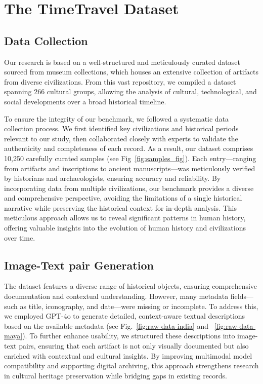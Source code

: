 \documentclass[11pt]{article}
\begin{document}
\section{The TimeTravel Dataset}

\subsection{Data Collection}
Our research is based on a well-structured and meticulously curated dataset sourced from museum collections, which houses an extensive collection of artifacts from diverse civilizations. From this vast repository, we compiled a dataset spanning 266 cultural groups, allowing the analysis of cultural, technological, and social developments over a broad historical timeline.

To ensure the integrity of our benchmark, we followed a systematic data collection process. We first identified key civilizations and historical periods relevant to our study, then collaborated closely with experts to validate the authenticity and completeness of each record. As a result, our dataset comprises 10,250 carefully curated samples (see Fig~\ref{fig:samples_fig}). Each entry—ranging from artifacts and inscriptions to ancient manuscripts—was meticulously verified by historians and archaeologists, ensuring accuracy and reliability. By incorporating data from multiple civilizations, our benchmark provides a diverse and comprehensive perspective, avoiding the limitations of a single historical narrative while preserving the historical context for in-depth analysis. This meticulous approach allows us to reveal significant patterns in human history, offering valuable insights into the evolution of human history and civilizations over time. 

\subsection{Image-Text pair Generation}
The dataset features a diverse range of historical objects, ensuring comprehensive documentation and contextual understanding. However, many metadata fields—such as title, iconography, and date—were missing or incomplete. To address this, we employed GPT-4o to generate detailed, context-aware textual descriptions based on the available metadata (see Fig.~\ref{fig:raw-data-india} and ~\ref{fig:raw-data-maya}). To further enhance usability, we structured these descriptions into image-text pairs, ensuring that each artifact is not only visually documented but also enriched with contextual and cultural insights. By improving multimodal model compatibility and supporting digital archiving, this approach strengthens research in cultural heritage preservation while bridging gaps in existing records.
\end{document}

